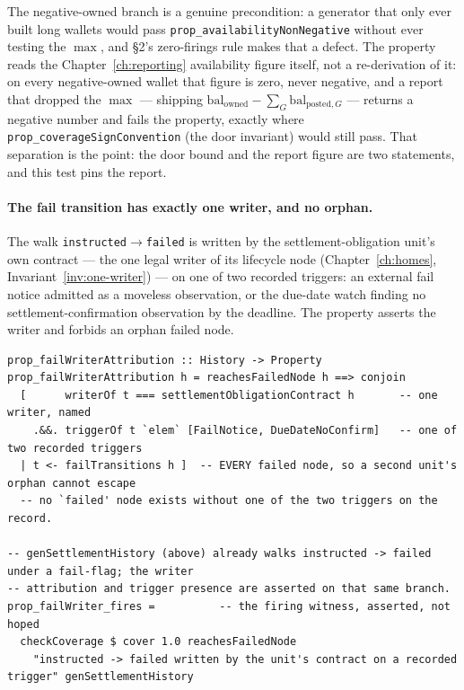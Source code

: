 The negative-owned branch is a genuine precondition: a generator that only ever built long wallets
would pass \texttt{prop\_availabilityNonNegative} without ever testing the $\max$, and \S 2's
zero-firings rule makes that a defect. The property reads the Chapter~\ref{ch:reporting} availability
figure itself, not a re-derivation of it: on every negative-owned wallet that figure is zero, never
negative, and a report that dropped the $\max$ --- shipping $\mathrm{bal}_{\text{owned}}-\sum_G
\mathrm{bal}_{\text{posted},G}$ --- returns a negative number and fails the property, exactly where
\texttt{prop\_coverageSignConvention} (the door invariant) would still pass. That separation is the
point: the door bound and the report figure are two statements, and this test pins the report.

\paragraph{The fail transition has exactly one writer, and no orphan.}
The walk \texttt{instructed}$\to$\texttt{failed} is written by the settlement-obligation unit's own
contract --- the one legal writer of its lifecycle node (Chapter~\ref{ch:homes},
Invariant~\ref{inv:one-writer}) --- on one of two recorded triggers: an external fail notice
admitted as a moveless observation, or the due-date watch finding no settlement-confirmation
observation by the deadline. The property asserts the writer and forbids an orphan failed node.

\begin{lstlisting}
prop_failWriterAttribution :: History -> Property
prop_failWriterAttribution h = reachesFailedNode h ==> conjoin
  [      writerOf t === settlementObligationContract h       -- one writer, named
    .&&. triggerOf t `elem` [FailNotice, DueDateNoConfirm]   -- one of two recorded triggers
  | t <- failTransitions h ]  -- EVERY failed node, so a second unit's orphan cannot escape
  -- no `failed' node exists without one of the two triggers on the record.

-- genSettlementHistory (above) already walks instructed -> failed under a fail-flag; the writer
-- attribution and trigger presence are asserted on that same branch.
prop_failWriter_fires =          -- the firing witness, asserted, not hoped
  checkCoverage $ cover 1.0 reachesFailedNode
    "instructed -> failed written by the unit's contract on a recorded trigger" genSettlementHistory
\end{lstlisting}

